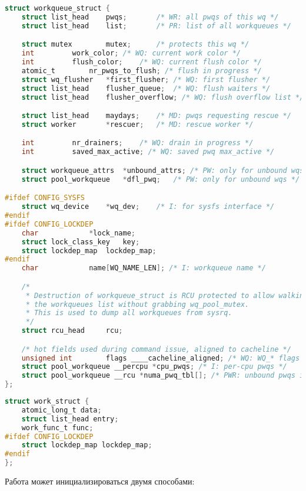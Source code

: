 \begin{lstlisting}[language=c, label=some-code, caption=Структура workqueue\_struct]
struct workqueue_struct {
	struct list_head	pwqs;		/* WR: all pwqs of this wq */
	struct list_head	list;		/* PR: list of all workqueues */

	struct mutex		mutex;		/* protects this wq */
	int			work_color;	/* WQ: current work color */
	int			flush_color;	/* WQ: current flush color */
	atomic_t		nr_pwqs_to_flush; /* flush in progress */
	struct wq_flusher	*first_flusher;	/* WQ: first flusher */
	struct list_head	flusher_queue;	/* WQ: flush waiters */
	struct list_head	flusher_overflow; /* WQ: flush overflow list */

	struct list_head	maydays;	/* MD: pwqs requesting rescue */
	struct worker		*rescuer;	/* MD: rescue worker */

	int			nr_drainers;	/* WQ: drain in progress */
	int			saved_max_active; /* WQ: saved pwq max_active */

	struct workqueue_attrs	*unbound_attrs;	/* PW: only for unbound wqs */
	struct pool_workqueue	*dfl_pwq;	/* PW: only for unbound wqs */

#ifdef CONFIG_SYSFS
	struct wq_device	*wq_dev;	/* I: for sysfs interface */
#endif
#ifdef CONFIG_LOCKDEP
	char			*lock_name;
	struct lock_class_key	key;
	struct lockdep_map	lockdep_map;
#endif
	char			name[WQ_NAME_LEN]; /* I: workqueue name */

	/*
	 * Destruction of workqueue_struct is RCU protected to allow walking
	 * the workqueues list without grabbing wq_pool_mutex.
	 * This is used to dump all workqueues from sysrq.
	 */
	struct rcu_head		rcu;

	/* hot fields used during command issue, aligned to cacheline */
	unsigned int		flags ____cacheline_aligned; /* WQ: WQ_* flags */
	struct pool_workqueue __percpu *cpu_pwqs; /* I: per-cpu pwqs */
	struct pool_workqueue __rcu *numa_pwq_tbl[]; /* PWR: unbound pwqs indexed by node */
};

\end{lstlisting}

\begin{lstlisting}[language=c, label=some-code, caption=Структура work\_struct]
struct work_struct {
	atomic_long_t data;
	struct list_head entry;
	work_func_t func;
#ifdef CONFIG_LOCKDEP
	struct lockdep_map lockdep_map;
#endif
};
\end{lstlisting}

Работа может инициализироваться двумя способами:

